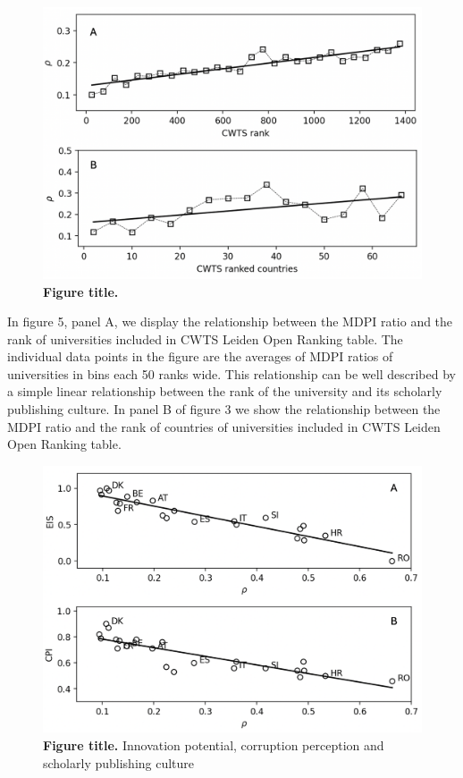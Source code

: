 \documentclass[amsfonts, amssymb, prl, superscriptaddress, notitlepage, twocolumn, nofootinbib]{revtex4-2}
\begin{document}
\begin{figure}
    \centering
    \includegraphics[width=1.0\linewidth]{Fig03f.png}
    \caption{\label{fig:fig5} {\bf Figure title.} 
}
\end{figure}

In figure 5, panel A, we display the relationship between the MDPI ratio and the rank of universities included in CWTS Leiden Open Ranking table. The individual data points in the figure are the averages of MDPI ratios of universities in bins each 50 ranks wide. This relationship can be well described by a simple linear relationship between the rank of the university and its scholarly publishing culture. In panel B of figure 3 we show the relationship between the MDPI ratio and the rank of countries of universities included in CWTS Leiden Open Ranking table. 

\begin{figure}
    \centering
    \includegraphics[width=1.0\linewidth]{Fig04f.png}
    \caption{\label{fig:fig6} {\bf Figure title.} Innovation potential, corruption perception and scholarly publishing culture
}
\end{figure}
\end{document}
